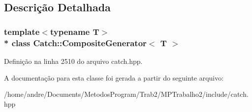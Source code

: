 \subsection{Descrição Detalhada}
\subsubsection*{template$<$typename T$>$\\*
class Catch\+::\+Composite\+Generator$<$ T $>$}



Definição na linha 2510 do arquivo catch.\+hpp.



A documentação para esta classe foi gerada a partir do seguinte arquivo\+:\begin{DoxyCompactItemize}
\item 
/home/andre/\+Documents/\+Metodos\+Program/\+Trab2/\+M\+P\+Trabalho2/include/catch.\+hpp\end{DoxyCompactItemize}
